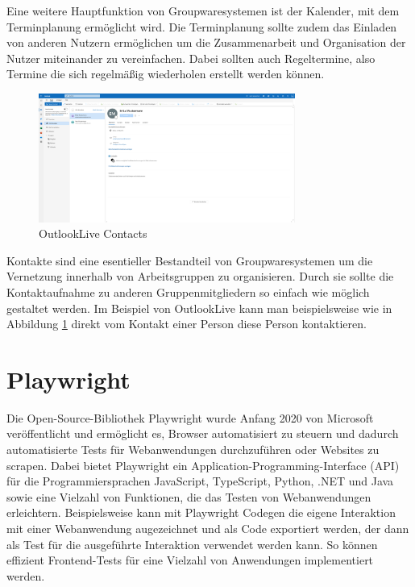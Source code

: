 Eine weitere Hauptfunktion von Groupwaresystemen ist der Kalender, mit dem Terminplanung ermöglicht wird.
Die Terminplanung sollte zudem das Einladen von anderen Nutzern ermöglichen um die Zusammenarbeit und Organisation der Nutzer miteinander zu vereinfachen.
Dabei sollten auch Regeltermine, also Termine die sich regelmäßig wiederholen erstellt werden können.

\begin{figure}[H]
    \centering
    \includegraphics[width=0.75\textwidth]{images/OutlookLive_Contacts.png}
    \caption{OutlookLive Contacts}
    \label{fig:outlook-live-contacts}
\end{figure}

Kontakte sind eine esentieller Bestandteil von Groupwaresystemen um die Vernetzung innerhalb von Arbeitsgruppen zu organisieren.
Durch sie sollte die Kontaktaufnahme zu anderen Gruppenmitgliedern so einfach wie möglich gestaltet werden.
Im Beispiel von OutlookLive kann man beispielsweise wie in Abbildung \ref{fig:outlook-live-contacts} direkt vom Kontakt einer Person diese Person kontaktieren.


\section{Playwright}

Die Open-Source-Bibliothek Playwright wurde Anfang 2020 von Microsoft veröffentlicht und ermöglicht es, Browser automatisiert zu steuern und dadurch automatisierte Tests für Webanwendungen durchzuführen oder Websites zu scrapen.
Dabei bietet Playwright ein Application-Programming-Interface (API) für die Programmiersprachen JavaScript, TypeScript, Python, .NET und Java sowie eine Vielzahl von Funktionen, die das Testen von Webanwendungen erleichtern.
Beispielsweise kann mit Playwright Codegen die eigene Interaktion mit einer Webanwendung augezeichnet und als Code exportiert werden, der dann als Test für die ausgeführte Interaktion verwendet werden kann.
So können effizient Frontend-Tests für eine Vielzahl von Anwendungen implementiert werden.
\autocite[Quelle:][]{playwright}

